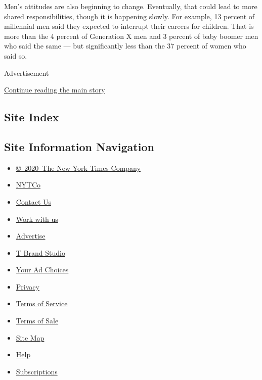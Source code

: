 Men's attitudes are also beginning to change. Eventually, that could
lead to more shared responsibilities, though it is happening slowly. For
example, 13 percent of millennial men said they expected to interrupt
their careers for children. That is more than the 4 percent of
Generation X men and 3 percent of baby boomer men who said the same ---
but significantly less than the 37 percent of women who said so.

Advertisement

\protect\hyperlink{after-bottom}{Continue reading the main story}

\hypertarget{site-index}{%
\subsection{Site Index}\label{site-index}}

\hypertarget{site-information-navigation}{%
\subsection{Site Information
Navigation}\label{site-information-navigation}}

\begin{itemize}
\tightlist
\item
  \href{https://help.nytimes3xbfgragh.onion/hc/en-us/articles/115014792127-Copyright-notice}{©~2020~The
  New York Times Company}
\end{itemize}

\begin{itemize}
\tightlist
\item
  \href{https://www.nytco.com/}{NYTCo}
\item
  \href{https://help.nytimes3xbfgragh.onion/hc/en-us/articles/115015385887-Contact-Us}{Contact
  Us}
\item
  \href{https://www.nytco.com/careers/}{Work with us}
\item
  \href{https://nytmediakit.com/}{Advertise}
\item
  \href{http://www.tbrandstudio.com/}{T Brand Studio}
\item
  \href{https://www.nytimes3xbfgragh.onion/privacy/cookie-policy\#how-do-i-manage-trackers}{Your
  Ad Choices}
\item
  \href{https://www.nytimes3xbfgragh.onion/privacy}{Privacy}
\item
  \href{https://help.nytimes3xbfgragh.onion/hc/en-us/articles/115014893428-Terms-of-service}{Terms
  of Service}
\item
  \href{https://help.nytimes3xbfgragh.onion/hc/en-us/articles/115014893968-Terms-of-sale}{Terms
  of Sale}
\item
  \href{https://spiderbites.nytimes3xbfgragh.onion}{Site Map}
\item
  \href{https://help.nytimes3xbfgragh.onion/hc/en-us}{Help}
\item
  \href{https://www.nytimes3xbfgragh.onion/subscription?campaignId=37WXW}{Subscriptions}
\end{itemize}
